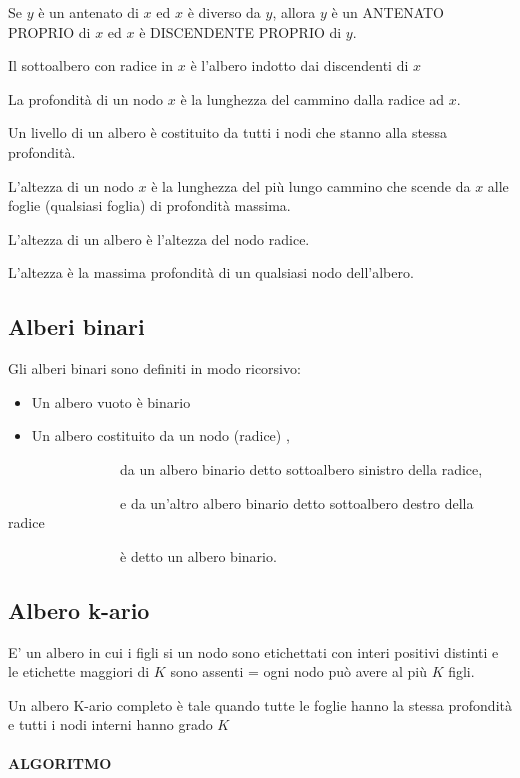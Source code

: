 \documentclass[11pt,a4paper,twoside,openright]{book}
\providecommand{\tightlist}{\setlength{\itemsep}{0pt}\setlength{\parskip}{0pt}}
\let\oldparagraph\paragraph
\renewcommand{\paragraph}[1]{\oldparagraph{#1}\mbox{}}
\begin{document}
{{{Se $y$ è un antenato di $x$ ed $x$ è diverso da $y$, allora $y$ è un ANTENATO PROPRIO di $x$ ed $x$ è DISCENDENTE PROPRIO di $y$.}

{Il sottoalbero con radice in $x$ è l'albero indotto dai discendenti di $x$}

{La profondità di un nodo $x$ è la lunghezza del cammino dalla radice ad $x$.}

{Un livello di un albero è costituito da tutti i nodi che stanno alla stessa profondità. }

{L'altezza di un nodo $x$ è la lunghezza del più lungo cammino che scende da $x$ alle foglie (qualsiasi foglia) di profondità massima.}

{L'altezza di un albero è l'altezza del nodo radice.}

{L'altezza è la massima profondità di un qualsiasi nodo dell'albero.}

\subsection{Alberi binari}

{Gli alberi binari sono definiti in modo ricorsivo:}

\begin{itemize}
\tightlist
\item
  {Un albero vuoto è binario}
\item
  {Un albero costituito da un nodo (radice) ,}
\end{itemize}

{~~~~~~~~~~~~~~~~da un albero binario detto sottoalbero sinistro della
radice,}

{~~~~~~~~~~~~~~~~e da un'altro albero binario detto sottoalbero destro
della radice}

{~~~~~~~~~~~~~~~~è detto un albero binario.}

\subsection{Albero k-ario}

{E' un albero in cui i figli si un nodo sono etichettati con interi positivi distinti e le etichette maggiori di $K$ sono assenti = ogni nodo può avere al più $K$ figli.}

{Un albero K-ario completo è tale quando tutte le foglie hanno la stessa profondità e tutti i nodi interni hanno grado $K$}

\paragraph{ALGORITMO}

}}
\end{document}
